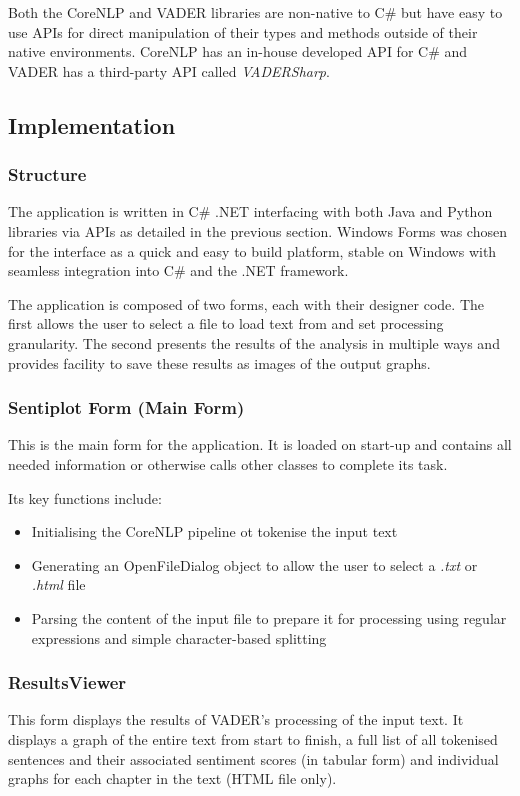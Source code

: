 \documentclass{article}
\begin{document}
        Both the CoreNLP and VADER libraries are non-native to C\# but have easy to use APIs for direct manipulation of their types and methods outside of their native environments. CoreNLP has an in-house developed API for C\# and VADER has a third-party API called \emph{VADERSharp}.
    \subsection{Implementation}
        \subsubsection{Structure}
            The application is written in C\# .NET interfacing with both Java and Python libraries via APIs as detailed in the previous section. Windows Forms was chosen for the interface as a quick and easy to build platform, stable on Windows with seamless integration into C\# and the .NET framework.

            The application is composed of two forms, each with their designer code. The first allows the user to select a file to load text from and set processing granularity. The second presents the results of the analysis in multiple ways and provides facility to save these results as images of the output graphs.
        \subsubsection{Sentiplot Form (Main Form)}
            This is the main form for the application. It is loaded on start-up and contains all needed information or otherwise calls other classes to complete its task.

            Its key functions include:
            \begin{itemize}
                \item Initialising the CoreNLP pipeline ot tokenise the input text
                \item Generating an OpenFileDialog object to allow the user to select a \emph{.txt} or \emph{.html} file
                \item Parsing the content of the input file to prepare it for processing using regular expressions and simple character-based splitting
            \end{itemize}
        \subsubsection{ResultsViewer}
            This form displays the results of VADER's processing of the input text. It displays a graph of the entire text from start to finish, a full list of all tokenised sentences and their associated sentiment scores (in tabular form) and individual graphs for each chapter in the text (HTML file only).
\end{document}

